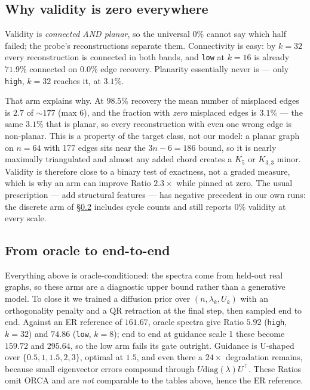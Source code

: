 \documentclass[11pt]{article}
\begin{document}
\subsection{Why validity is zero everywhere}
\label{sec:validity}
Validity is \emph{connected AND planar}, so the universal $0\%$ cannot say which half failed; the
probe's reconstructions separate them.
Connectivity is easy: by $k{=}32$ every reconstruction is connected in both bands, and
\texttt{low} at $k{=}16$ is already $71.9\%$ connected on $0.0\%$ edge recovery. Planarity
essentially never is --- only \texttt{high}, $k{=}32$ reaches it, at $3.1\%$.

That arm explains why. At $98.5\%$ recovery the mean number of misplaced edges is $2.7$ of
${\sim}177$ (max 6), and the fraction with \emph{zero} misplaced edges is $3.1\%$ --- the same $3.1\%$ that is planar,
so every reconstruction with even one wrong edge is non-planar. This is a property of the target
class, not our model: a planar graph on $n{=}64$ with 177
edges sits near the $3n-6 = 186$ bound, so it is nearly maximally triangulated and almost any
added chord creates a $K_5$ or $K_{3,3}$ minor. Validity is therefore close to a binary test of
exactness, not a graded measure, which is why an arm can improve Ratio $2.3\times$
while pinned at zero. The usual prescription --- add structural features --- has negative
precedent in our own runs: the discrete arm of \S\ref{sec:e2e} includes cycle counts and still
reports $0\%$ validity at every scale.

\subsection{From oracle to end-to-end}
\label{sec:e2e}
Everything above is oracle-conditioned: the spectra come from held-out real graphs, so these
arms are a diagnostic upper bound rather than a generative model. To close it we trained a diffusion prior over $(n, \lambda_k, U_k)$ with an orthogonality penalty
and a QR retraction at the final step, then sampled end to end. Against an ER reference of $161.67$,
oracle spectra give Ratio $5.92$ (\texttt{high}, $k{=}32$) and $74.86$ (\texttt{low}, $k{=}8$);
end to end at guidance scale 1 these become $159.72$ and $295.64$, so the low arm fails its gate
outright. Guidance is U-shaped over $\{0.5,1,1.5,2,3\}$, optimal at $1.5$, and even there a
$24\times$ degradation remains, because small eigenvector errors compound through $U
\mathrm{diag}(\lambda) U^\top$. These Ratios omit ORCA and are
\emph{not} comparable to the tables above, hence the ER reference.
\end{document}
